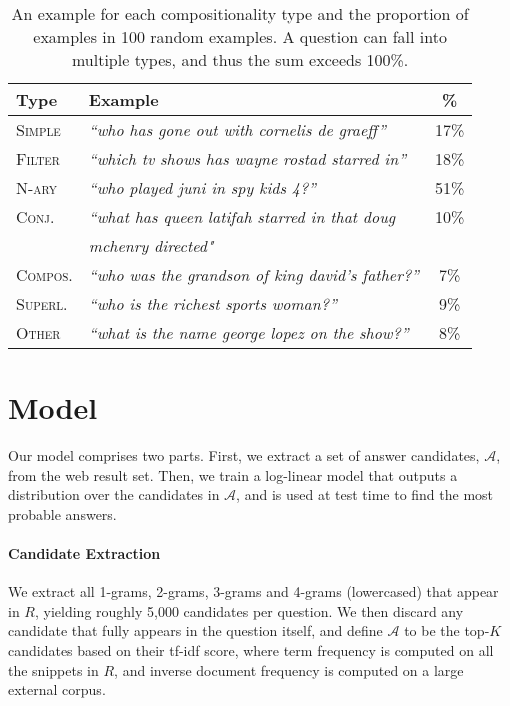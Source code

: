 \documentclass[11pt,a4paper]{article}
\newcommand\nl[1]{{\it``#1''}}
\begin{document}
\begin{table}[t]
\begin{center}
\scriptsize{
\begin{tabular}{l|l|c}
 \toprule
 \textbf{Type} & \textbf{Example} & \% \\ 
 \midrule
\textsc{Simple}      & \nl{who has gone out with cornelis de graeff} & 17\%  \\ 
\textsc{Filter}          & \nl{which tv shows has wayne rostad starred in}  &  18\% \\ 
\textsc{N-ary}          &  \nl{who played juni in spy kids 4?} & 51\%  \\ 
\textsc{Conj.}          & \emph{``what has queen latifah starred in that doug}  & 10\%  \\ 
   & \emph{mchenry directed"}  &  \\ 
\textsc{Compos.}          & \nl{who was the grandson of king david's father?} &  7\% \\
\textsc{Superl.}          &  \nl{who is the richest sports woman?} &  9\% \\ 
\textsc{Other}          &  \nl{what is the name george lopez on the show?} &  8\% \\ 
\toprule
\end{tabular}}
\end{center}
\caption{An example for each compositionality type and the proportion of examples in 100 random examples. A question can fall into multiple types, and thus the sum exceeds 100\%.}
\label{tab:compositionality}
\end{table}
 \section{Model}
Our model comprises two parts. First, we extract a set of answer candidates, $\mathcal{A}$, from the web result set. Then, we train a log-linear model that outputs a distribution over the candidates in $\mathcal{A}$, and is used at test time to find the most probable answers.

\paragraph{Candidate Extraction}
We extract all 1-grams, 2-grams, 3-grams and 4-grams (lowercased) that appear in $R$, yielding roughly 5,000 candidates per question. We then discard any candidate that fully appears in the question itself, and define $\mathcal{A}$ to be  the top-$K$ candidates based on their tf-idf score, where term frequency is computed on all the snippets in $R$, and inverse document frequency is computed on a large external corpus.
\end{document}
